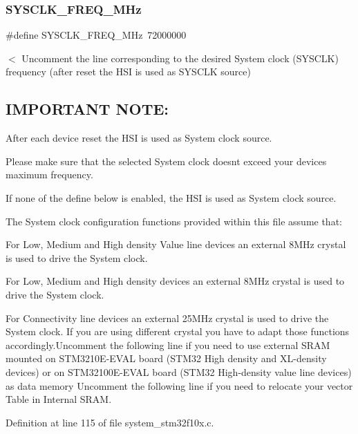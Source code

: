 \subsubsection{\texorpdfstring{S\+Y\+S\+C\+L\+K\+\_\+\+F\+R\+E\+Q\+\_\+M\+Hz}{SYSCLK\_FREQ\_72MHz}}
{\footnotesize\ttfamily \#define S\+Y\+S\+C\+L\+K\+\_\+\+F\+R\+E\+Q\+\_\+M\+Hz~72000000}

$<$ Uncomment the line corresponding to the desired System clock (S\+Y\+S\+C\+LK) frequency (after reset the H\+SI is used as S\+Y\+S\+C\+LK source)

\subsection*{I\+M\+P\+O\+R\+T\+A\+NT N\+O\+TE\+: }


\begin{DoxyEnumerate}
\item After each device reset the H\+SI is used as System clock source.
\item Please make sure that the selected System clock doesn\textquotesingle{}t exceed your device\textquotesingle{}s maximum frequency.
\item If none of the define below is enabled, the H\+SI is used as System clock source.
\item The System clock configuration functions provided within this file assume that\+:
\begin{DoxyItemize}
\item For Low, Medium and High density Value line devices an external 8\+M\+Hz crystal is used to drive the System clock.
\item For Low, Medium and High density devices an external 8\+M\+Hz crystal is used to drive the System clock.
\item For Connectivity line devices an external 25\+M\+Hz crystal is used to drive the System clock. If you are using different crystal you have to adapt those functions accordingly.\+Uncomment the following line if you need to use external S\+R\+AM mounted on S\+T\+M3210\+E-\/\+E\+V\+AL board (S\+T\+M32 High density and X\+L-\/density devices) or on S\+T\+M32100\+E-\/\+E\+V\+AL board (S\+T\+M32 High-\/density value line devices) as data memory Uncomment the following line if you need to relocate your vector Table in Internal S\+R\+AM. 
\end{DoxyItemize}
\end{DoxyEnumerate}

Definition at line 115 of file system\+\_\+stm32f10x.\+c.

